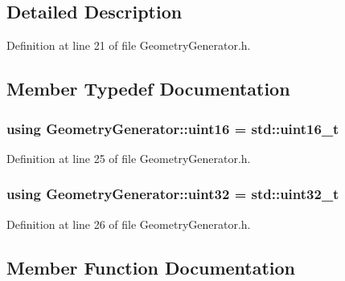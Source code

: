 \subsection{Detailed Description}


Definition at line 21 of file Geometry\+Generator.\+h.



\subsection{Member Typedef Documentation}
\subsubsection[{\texorpdfstring{uint16}{uint16}}]{\setlength{\rightskip}{0pt plus 5cm}using {\bf Geometry\+Generator\+::uint16} =  std\+::uint16\+\_\+t}\hypertarget{class_geometry_generator_a2b566f68436d7cca7976e6d7e3bae53d_a2b566f68436d7cca7976e6d7e3bae53d}{}\label{class_geometry_generator_a2b566f68436d7cca7976e6d7e3bae53d_a2b566f68436d7cca7976e6d7e3bae53d}


Definition at line 25 of file Geometry\+Generator.\+h.

\subsubsection[{\texorpdfstring{uint32}{uint32}}]{\setlength{\rightskip}{0pt plus 5cm}using {\bf Geometry\+Generator\+::uint32} =  std\+::uint32\+\_\+t}\hypertarget{class_geometry_generator_a37fc6dd464913f90a718f59862a9beeb_a37fc6dd464913f90a718f59862a9beeb}{}\label{class_geometry_generator_a37fc6dd464913f90a718f59862a9beeb_a37fc6dd464913f90a718f59862a9beeb}


Definition at line 26 of file Geometry\+Generator.\+h.



\subsection{Member Function Documentation}
